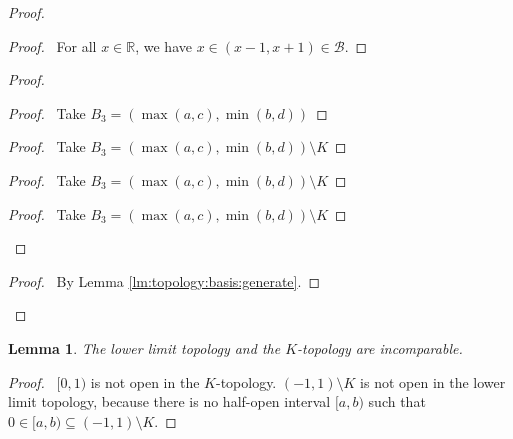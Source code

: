 \documentclass{report}
\let\qed\relax
\newtheorem{lm}{Lemma}[section]
\theoremstyle{definition}
\begin{document}
  \begin{proof}
    \pf
    \begin{proof}
      \pf\ For all $x \in \mathbb{R}$, we have $x \in (x-1, x+1) \in
      \mathcal{B}$.
    \end{proof}
    \begin{proof}
      \begin{proof}
        \pf\ Take $B_3 = (\max(a,c), \min(b,d))$
      \end{proof}
      \begin{proof}
        \pf\ Take $B_3 = (\max(a,c), \min(b,d)) \setminus K$
      \end{proof}
      \begin{proof}
        \pf\ Take $B_3 = (\max(a,c), \min(b,d)) \setminus K$
      \end{proof}
      \begin{proof}
        \pf\ Take $B_3 = (\max(a,c), \min(b,d)) \setminus K$
      \end{proof}
    \end{proof}
    \qedstep
    \begin{proof}
      \pf\ By Lemma \ref{lm:topology:basis:generate}.
    \end{proof}
    \qed
  \end{proof}

  \begin{lm}
    The lower limit topology and the $K$-topology are incomparable.
  \end{lm}

  \begin{proof}
    \pf\ $[0, 1)$ is not open in the $K$-topology. $(-1, 1) \setminus K$ is not
    open in the lower limit topology, because there is no half-open interval
    $[a,
    b)$ such that $0 \in [a,b) \subseteq (-1, 1) \setminus K$. \qed
  \end{proof}
\end{document}

